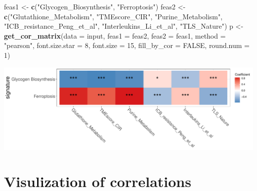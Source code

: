 \documentclass[
  12pt,
]{book}
\newenvironment{Shaded}{\begin{snugshade}}{\end{snugshade}}
\newcommand{\AttributeTok}[1]{\textcolor[rgb]{0.13,0.29,0.53}{#1}}
\newcommand{\ConstantTok}[1]{\textcolor[rgb]{0.56,0.35,0.01}{#1}}
\newcommand{\DecValTok}[1]{\textcolor[rgb]{0.00,0.00,0.81}{#1}}
\newcommand{\FunctionTok}[1]{\textcolor[rgb]{0.13,0.29,0.53}{\textbf{#1}}}
\newcommand{\NormalTok}[1]{#1}
\newcommand{\OtherTok}[1]{\textcolor[rgb]{0.56,0.35,0.01}{#1}}
\newcommand{\SpecialCharTok}[1]{\textcolor[rgb]{0.81,0.36,0.00}{\textbf{#1}}}
\newcommand{\StringTok}[1]{\textcolor[rgb]{0.31,0.60,0.02}{#1}}
\theoremstyle{definition}
\theoremstyle{definition}
\theoremstyle{definition}
\theoremstyle{definition}
\theoremstyle{remark}
\begin{document}
\begin{Shaded}
\begin{Highlighting}[]
\NormalTok{feas1 }\OtherTok{\textless{}{-}} \FunctionTok{c}\NormalTok{(}\StringTok{"Glycogen\_Biosynthesis"}\NormalTok{, }\StringTok{"Ferroptosis"}\NormalTok{)}
\NormalTok{feas2 }\OtherTok{\textless{}{-}} \FunctionTok{c}\NormalTok{(}\StringTok{"Glutathione\_Metabolism"}\NormalTok{, }\StringTok{"TMEscore\_CIR"}\NormalTok{, }\StringTok{"Purine\_Metabolism"}\NormalTok{, }\StringTok{"ICB\_resistance\_Peng\_et\_al"}\NormalTok{, }\StringTok{"Interleukins\_Li\_et\_al"}\NormalTok{, }\StringTok{"TLS\_Nature"}\NormalTok{)}
\NormalTok{p }\OtherTok{\textless{}{-}} \FunctionTok{get\_cor\_matrix}\NormalTok{(}\AttributeTok{data           =}\NormalTok{ input, }
                    \AttributeTok{feas1          =}\NormalTok{ feas2, }
                    \AttributeTok{feas2          =}\NormalTok{ feas1,}
                    \AttributeTok{method         =} \StringTok{"pearson"}\NormalTok{,}
                    \AttributeTok{font.size.star =} \DecValTok{8}\NormalTok{, }
                    \AttributeTok{font.size      =} \DecValTok{15}\NormalTok{, }
                    \AttributeTok{fill\_by\_cor    =} \ConstantTok{FALSE}\NormalTok{, }
                    \AttributeTok{round.num      =} \DecValTok{1}\NormalTok{)}
\end{Highlighting}
\end{Shaded}

\includegraphics{_main_files/figure-latex/unnamed-chunk-54-1.pdf}

\hypertarget{visulization-of-correlations}{%
\section{Visulization of correlations}\label{visulization-of-correlations}}

\begin{Shaded}
\end{Shaded}
\end{document}
